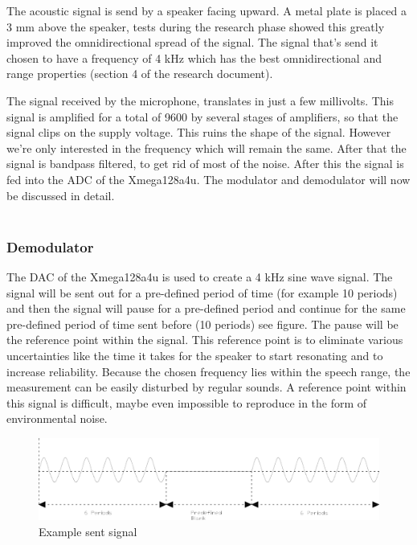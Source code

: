 \documentclass[10pt,a4paper]{article}
\begin{document}
The acoustic signal is send by a speaker facing upward. A metal plate is placed a 3 mm above the speaker, tests during the research phase showed this greatly improved the omnidirectional spread of the signal. The signal that's send it chosen to have a frequency of 4 kHz which has the best omnidirectional and range properties (section 4 of the research document).


The signal received by the microphone, translates in just a few millivolts. This signal is amplified for a total of 9600 by several stages of amplifiers, so that the signal clips on the supply voltage. This ruins the shape of the signal. However we're only interested in the frequency which will remain the same. After that the signal is bandpass filtered, to get rid of most of the noise. After this the signal is fed into the ADC of the Xmega128a4u. The modulator and demodulator will now be discussed in detail.\\\\
\subsubsection{Demodulator}
The DAC of the Xmega128a4u is used to create a 4 kHz sine wave signal. The signal will be sent out for a pre-defined period of time (for example 10 periods) and then the signal will pause for a pre-defined period and continue for the same pre-defined period of time sent before (10 periods) see figure\cite{fig:Signal}. The pause will be the reference point within the signal. This reference point is to eliminate various uncertainties like the time it takes for the speaker to start resonating and to increase reliability. Because the chosen frequency lies within the speech range, the measurement can be easily disturbed by regular sounds. A reference point within this signal is difficult, maybe even impossible to reproduce in the form of environmental noise.

 \begin{figure}[h]
     \centering
     \includegraphics[width=1\textwidth]{sinesignal.pdf}
     \caption{Example sent signal }
     \label{fig:Signal}
 \end{figure}
\end{document}
